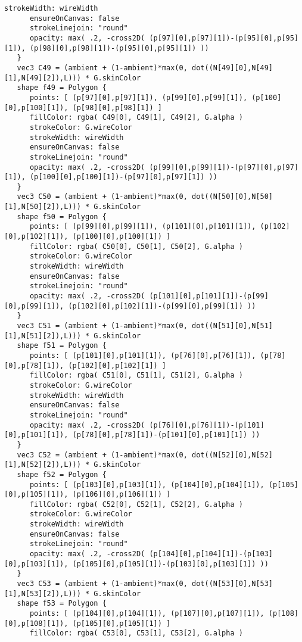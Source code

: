 \begin{lstlisting}[language=Sty-RT,escapechar=@]
      strokeWidth: wireWidth
      ensureOnCanvas: false
      strokeLinejoin: "round"
      opacity: max( .2, -cross2D( (p[97][0],p[97][1])-(p[95][0],p[95][1]), (p[98][0],p[98][1])-(p[95][0],p[95][1]) ))
   }
   vec3 C49 = (ambient + (1-ambient)*max(0, dot((N[49][0],N[49][1],N[49][2]),L))) * G.skinColor
   shape f49 = Polygon {
      points: [ (p[97][0],p[97][1]), (p[99][0],p[99][1]), (p[100][0],p[100][1]), (p[98][0],p[98][1]) ]
      fillColor: rgba( C49[0], C49[1], C49[2], G.alpha )
      strokeColor: G.wireColor
      strokeWidth: wireWidth
      ensureOnCanvas: false
      strokeLinejoin: "round"
      opacity: max( .2, -cross2D( (p[99][0],p[99][1])-(p[97][0],p[97][1]), (p[100][0],p[100][1])-(p[97][0],p[97][1]) ))
   }
   vec3 C50 = (ambient + (1-ambient)*max(0, dot((N[50][0],N[50][1],N[50][2]),L))) * G.skinColor
   shape f50 = Polygon {
      points: [ (p[99][0],p[99][1]), (p[101][0],p[101][1]), (p[102][0],p[102][1]), (p[100][0],p[100][1]) ]
      fillColor: rgba( C50[0], C50[1], C50[2], G.alpha )
      strokeColor: G.wireColor
      strokeWidth: wireWidth
      ensureOnCanvas: false
      strokeLinejoin: "round"
      opacity: max( .2, -cross2D( (p[101][0],p[101][1])-(p[99][0],p[99][1]), (p[102][0],p[102][1])-(p[99][0],p[99][1]) ))
   }
   vec3 C51 = (ambient + (1-ambient)*max(0, dot((N[51][0],N[51][1],N[51][2]),L))) * G.skinColor
   shape f51 = Polygon {
      points: [ (p[101][0],p[101][1]), (p[76][0],p[76][1]), (p[78][0],p[78][1]), (p[102][0],p[102][1]) ]
      fillColor: rgba( C51[0], C51[1], C51[2], G.alpha )
      strokeColor: G.wireColor
      strokeWidth: wireWidth
      ensureOnCanvas: false
      strokeLinejoin: "round"
      opacity: max( .2, -cross2D( (p[76][0],p[76][1])-(p[101][0],p[101][1]), (p[78][0],p[78][1])-(p[101][0],p[101][1]) ))
   }
   vec3 C52 = (ambient + (1-ambient)*max(0, dot((N[52][0],N[52][1],N[52][2]),L))) * G.skinColor
   shape f52 = Polygon {
      points: [ (p[103][0],p[103][1]), (p[104][0],p[104][1]), (p[105][0],p[105][1]), (p[106][0],p[106][1]) ]
      fillColor: rgba( C52[0], C52[1], C52[2], G.alpha )
      strokeColor: G.wireColor
      strokeWidth: wireWidth
      ensureOnCanvas: false
      strokeLinejoin: "round"
      opacity: max( .2, -cross2D( (p[104][0],p[104][1])-(p[103][0],p[103][1]), (p[105][0],p[105][1])-(p[103][0],p[103][1]) ))
   }
   vec3 C53 = (ambient + (1-ambient)*max(0, dot((N[53][0],N[53][1],N[53][2]),L))) * G.skinColor
   shape f53 = Polygon {
      points: [ (p[104][0],p[104][1]), (p[107][0],p[107][1]), (p[108][0],p[108][1]), (p[105][0],p[105][1]) ]
      fillColor: rgba( C53[0], C53[1], C53[2], G.alpha )

\end{lstlisting}
